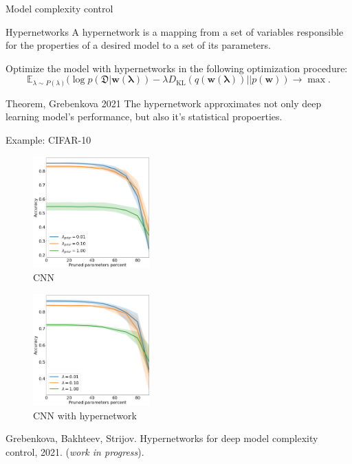 \documentclass[usenames,dvipsnames,11pt,pdf,utf8,russian,aspectratio=169]{beamer}
\begin{document}
\begin{frame}{Model complexity control}
\begin{block}{Hypernetworks}
A hypernetwork is a mapping from a set of variables responsible for the properties of a desired model to a set of its parameters.
\end{block}

Optimize the model with hypernetworks in the following optimization procedure:
\[
\mathbb{E}_{\lambda \sim P(\lambda)}
(\log p(\mathfrak{D}| \mathbf{w(\lambda)})
- \lambda D_{\text{KL}}(q(\mathbf{w(\lambda)})||p(\mathbf{w})) 
\to \max.
\]

\begin{block}{Theorem, Grebenkova 2021}
The hypernetwork approximates not only deep learning model's performance, but also it's statistical propoerties.
\end{block}
\end{frame}


\begin{frame}{Example: CIFAR-10}
\vspace{-0.5cm}
\begin{multicols}{2}
\begin{figure}[h]
\includegraphics[width=0.4\textwidth]{./cifar_hyper.png}
\caption*{CNN}
\end{figure}

\begin{figure}[h]
\includegraphics[width=0.4\textwidth]{./cifar_kernel.png}
\caption*{CNN with hypernetwork}
\end{figure}
\end{multicols}
{\footnotesize Grebenkova, Bakhteev, Strijov. Hypernetworks for deep model complexity control, 2021. (\textit{work in progress}).}
\end{frame}
\end{document}
